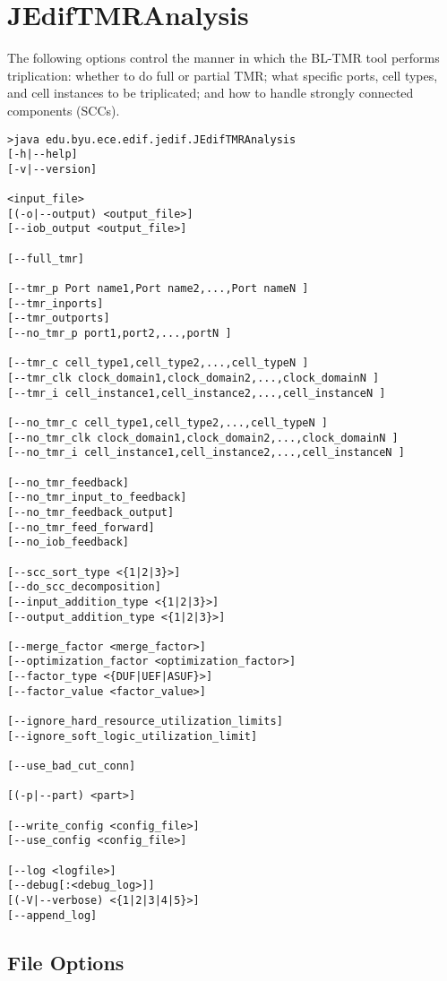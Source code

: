 \section{JEdifTMRAnalysis}

The following options control the manner in which the BL-TMR tool performs
triplication: whether to do full or partial TMR; what specific ports, cell
types, and cell instances to be triplicated; and how to handle strongly
connected components (SCCs).

\begin{verbatim}
>java edu.byu.ece.edif.jedif.JEdifTMRAnalysis
[-h|--help] 
[-v|--version] 

<input_file> 
[(-o|--output) <output_file>] 
[--iob_output <output_file>] 

[--full_tmr] 

[--tmr_p Port name1,Port name2,...,Port nameN ]
[--tmr_inports] 
[--tmr_outports] 
[--no_tmr_p port1,port2,...,portN ] 

[--tmr_c cell_type1,cell_type2,...,cell_typeN ] 
[--tmr_clk clock_domain1,clock_domain2,...,clock_domainN ] 
[--tmr_i cell_instance1,cell_instance2,...,cell_instanceN ] 

[--no_tmr_c cell_type1,cell_type2,...,cell_typeN ] 
[--no_tmr_clk clock_domain1,clock_domain2,...,clock_domainN ] 
[--no_tmr_i cell_instance1,cell_instance2,...,cell_instanceN ] 

[--no_tmr_feedback] 
[--no_tmr_input_to_feedback] 
[--no_tmr_feedback_output] 
[--no_tmr_feed_forward] 
[--no_iob_feedback] 

[--scc_sort_type <{1|2|3}>] 
[--do_scc_decomposition] 
[--input_addition_type <{1|2|3}>] 
[--output_addition_type <{1|2|3}>] 

[--merge_factor <merge_factor>] 
[--optimization_factor <optimization_factor>] 
[--factor_type <{DUF|UEF|ASUF}>] 
[--factor_value <factor_value>]

[--ignore_hard_resource_utilization_limits]
[--ignore_soft_logic_utilization_limit]

[--use_bad_cut_conn] 

[(-p|--part) <part>] 

[--write_config <config_file>]
[--use_config <config_file>]

[--log <logfile>]
[--debug[:<debug_log>]]
[(-V|--verbose) <{1|2|3|4|5}>]
[--append_log]

\end{verbatim}

\subsection{File Options}

